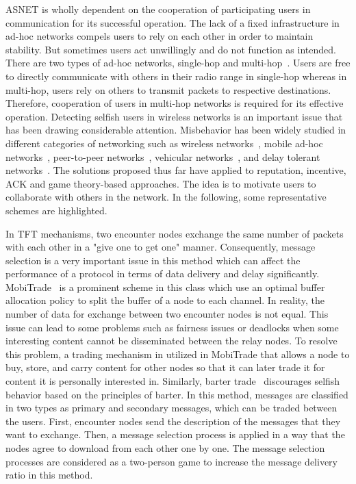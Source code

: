 ASNET is wholly dependent on the cooperation of participating users in communication for its successful operation. The lack of a fixed infrastructure in ad-hoc networks compels users to rely on each other in order to maintain stability. But sometimes users act unwillingly and do not function as intended. There are two types of ad-hoc networks, single-hop and multi-hop~\cite{NKang2010}. Users are free to directly communicate with others in their radio range in single-hop whereas in multi-hop, users rely on others to transmit packets to respective destinations. Therefore, cooperation of users in multi-hop networks is required for its effective operation. Detecting selfish users in wireless networks is an important issue that has been drawing considerable attention. Misbehavior has been widely studied in different categories of networking such as wireless networks~\cite{JChoi2011}, mobile ad-hoc networks~\cite{PGera2011}, peer-to-peer networks~\cite{DHales2005}, vehicular networks~\cite{MRaya2007}, and delay tolerant networks~\cite{YLi2011}\cite{QLiandGCao2012}. The solutions proposed thus far have applied to reputation, incentive, ACK and game theory-based approaches. The idea is to motivate users to collaborate with others in the network. In the following, some representative schemes are highlighted.

In TFT mechanisms, two encounter nodes exchange the same number of packets with each other in a "give one to get one" manner. Consequently, message selection is a very important issue in this method which can affect the performance of a protocol in terms of data delivery and delay significantly. MobiTrade~\cite{AKrifa2011} is a prominent scheme in this class which use an optimal buffer allocation policy to split the buffer of a node to each channel. In reality, the number of data for exchange between two encounter nodes is not equal. This issue can lead to some problems such as fairness issues or deadlocks when some interesting content cannot be disseminated between the relay nodes. To resolve this problem, a trading mechanism in utilized in MobiTrade that allows a node to buy, store, and carry content for other nodes so that it can later trade it for content it is personally interested in. Similarly, barter trade~\cite{LButtyan2010} discourages selfish behavior based on the principles of barter. In this method, messages are classified in two types as primary and secondary messages, which can be traded between the users. First, encounter nodes send the description of the messages that they want to exchange. Then, a message selection process is applied in a way that the nodes agree to download from each other one by one. The message selection processes are considered as a two-person game to increase the message delivery ratio in this method.

